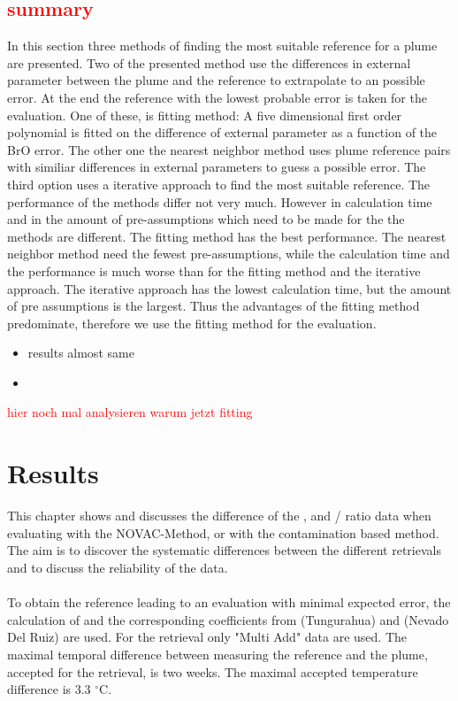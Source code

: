 \documentclass  [
  paper    = a4,
  BCOR     = 10mm,
  twoside,
  fontsize = 12pt,
  fleqn,
  toc      = bibnumbered,
  toc      = listofnumbered,
  numbers  = noendperiod,
  headings = normal,
  listof   = leveldown,
  version  = 3.03
]                                       {scrreprt}
\begin{document}
	
	
	\section*{\textcolor{red}{summary}}
	In this section three methods of finding the most suitable reference for a plume are presented.
	Two of the presented method use the differences in external parameter between the plume and the reference to extrapolate to an possible error. At the end the reference with the lowest probable error is taken for the evaluation. One of these, is fitting method: A five dimensional first order polynomial is fitted on the difference of external parameter as a function of the BrO error. The other one the nearest neighbor method uses plume reference pairs with similiar differences in external parameters to guess a possible error. The third option uses a iterative approach to find the most suitable reference. The performance of the methods differ not very much. However in calculation time and in the amount of pre-assumptions which need to be made for the the methods are different. The fitting method has the best performance. The nearest neighbor method need the fewest pre-assumptions, while the calculation time and the performance is much worse than for the fitting method and the iterative approach. The iterative approach has the lowest calculation time, but the amount of pre assumptions is the largest. Thus the advantages of the fitting method predominate, therefore we use the fitting method for the evaluation.
	\begin{itemize}
	\item results almost same
	\item 
	\end{itemize}
	\textcolor{red}{hier noch mal analysieren warum jetzt fitting}
	
	
	

	
	\chapter{Results}
	This chapter shows and discusses the difference of the ,  and /  ratio data when evaluating with the NOVAC-Method, or with the contamination based method.
	The aim is to discover the systematic differences between the different retrievals and to discuss the reliability of the data.\\
	\\
	To obtain the reference leading to an evaluation with minimal expected   error, the calculation of  and the corresponding coefficients from  (Tungurahua) and  (Nevado Del Ruiz) are used. 
	For the retrieval only "Multi Add" data are used. The maximal temporal difference between measuring the reference and the plume, accepted for the retrieval, is two weeks. The maximal accepted temperature difference is 3.3 $^{\circ}$C.\\
\end{document}
